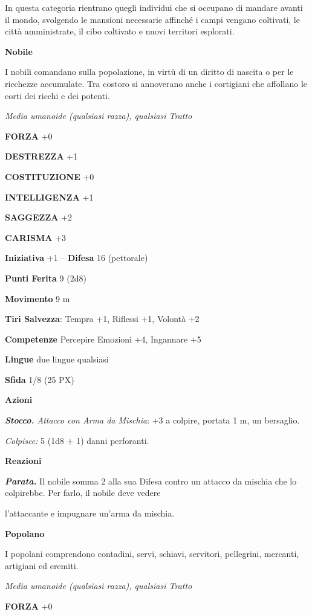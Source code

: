 \begin{multicols}{2}
	In questa categoria rientrano quegli individui che si occupano di mandare avanti il mondo, svolgendo le mansioni necessarie affinché i campi vengano coltivati, le città amministrate, il cibo coltivato e
	nuovi territori esplorati.

	\medskip\textbf{Nobile}

	I nobili comandano sulla popolazione, in virtù di un diritto di nascita o per le ricchezze accumulate. Tra costoro si annoverano anche i cortigiani che affollano le corti dei ricchi e dei potenti.

	\textit{Media umanoide (qualsiasi razza), qualsiasi Tratto}

	\textbf{FORZA} +0

	\textbf{DESTREZZA} +1

	\textbf{COSTITUZIONE} +0

	\textbf{INTELLIGENZA} +1

	\textbf{SAGGEZZA} +2

	\textbf{CARISMA} +3

	\textbf{Iniziativa} +1 -- \textbf{Difesa} 16 (pettorale)

	\textbf{Punti Ferita} 9 (2d8)

	\textbf{Movimento} 9 m

	\textbf{Tiri Salvezza}: Tempra +1, Riflessi +1, Volontà +2

	\textbf{Competenze} Percepire Emozioni +4, Ingannare +5

	\textbf{Lingue} due lingue qualsiasi

	\textbf{Sfida} 1/8 (25 PX)

	\textbf{Azioni}

	\textit{\textbf{Stocco.} Attacco con Arma da Mischia}: +3 a colpire, portata 1 m, un bersaglio.

	\textit{Colpisce:} 5 (1d8 + 1) danni perforanti.

	\textbf{Reazioni}

	\textit{\textbf{Parata.}} Il nobile somma 2 alla sua Difesa contro un attacco da mischia che lo colpirebbe. Per farlo, il nobile deve vedere

	l'attaccante e impugnare un'arma da mischia.

	\medskip\textbf{Popolano}

	I popolani comprendono contadini, servi, schiavi, servitori, pellegrini, mercanti, artigiani ed eremiti.

	\textit{Media umanoide (qualsiasi razza), qualsiasi Tratto}

	\textbf{FORZA} +0


\end{multicols}
